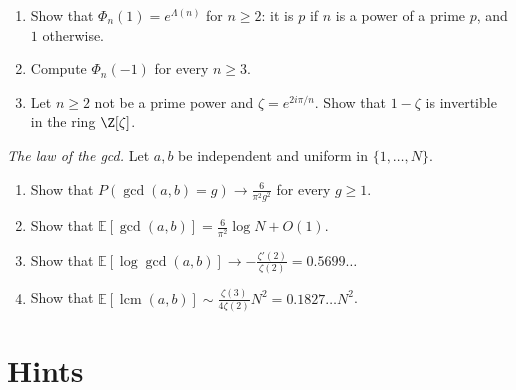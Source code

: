 \begin{exercise}[$\star\star$]\label{pb:phipm1}
\begin{enumerate}[label=(\alph*)]
\item Show that $\Phi_n(1)=e^{\Lambda(n)}$ for $n\ge2$: it is $p$ if $n$ is a power of a prime $p$, and $1$ otherwise.
\item Compute $\Phi_n(-1)$ for every $n\ge3$.
\item Let $n\ge2$ not be a prime power and $\zeta=e^{2i\pi/n}$. Show that $1-\zeta$ is invertible in the ring $\Z[\zeta]$.
\end{enumerate}
\end{exercise}

\begin{exercise}[$\star\star$]\label{pb:gcdmean}
\emph{The law of the gcd.} Let $a,b$ be independent and uniform in $\{1,\dots,N\}$.
\begin{enumerate}[label=(\alph*)]
\item Show that $P(\gcd(a,b)=g)\to\frac6{\pi^2g^2}$ for every $g\ge1$.
\item Show that $\mathbb E[\gcd(a,b)]=\frac6{\pi^2}\log N+O(1)$.
\item Show that $\mathbb E[\log\gcd(a,b)]\to-\frac{\zeta'(2)}{\zeta(2)}=0.5699\ldots$
\item Show that $\mathbb E[\operatorname{lcm}(a,b)]\sim\frac{\zeta(3)}{4\zeta(2)}N^2=0.1827\ldots N^2$.
\end{enumerate}
\end{exercise}

\section{Hints}

